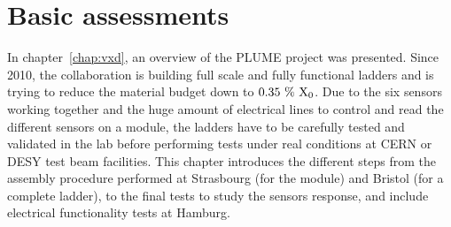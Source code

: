 \chapter{Basic assessments}
\label{chap:labTests}

  In chapter~\ref{chap:vxd}, an overview of the \gls{PLUME} project was presented.
  Since 2010, the collaboration is building full scale and fully functional ladders and is trying to reduce the material budget down to $0.35~\%~\rm{X_{0}}$.
  Due to the six sensors working together and the huge amount of electrical lines to control and read the different sensors on a module, the ladders have to be carefully tested and validated in the lab before performing tests under real conditions at \gls{CERN} or \gls{DESY} test beam facilities.
  This chapter introduces the different steps from the assembly procedure performed at Strasbourg (for the module) and Bristol (for a complete ladder), to the final tests to study the sensors response, and include electrical functionality tests at Hamburg.


